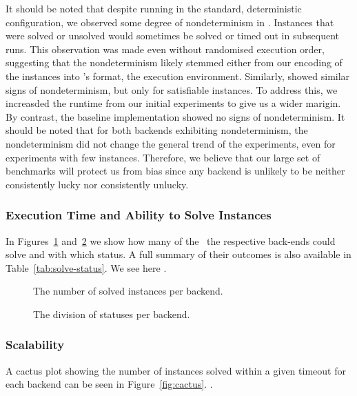 \documentclass[acmsmall,review,anonymous]{acmart}\settopmatter{printfolios=true,printccs=false,printacmref=true}
\theoremstyle{definition}
\begin{document}
It should be noted that despite running in the standard, deterministic configuration, we observed some degree of nondeterminism in \Nuxmv{}. Instances that were solved or unsolved would sometimes be solved or timed out in subsequent runs. This observation was made even without randomised execution order, suggesting that the nondeterminism likely stemmed either from our encoding of the instances into \Nuxmv{}'s format, the execution environment. Similarly, \Calculus{} showed similar signs of nondeterminism, but only for satisfiable instances. To address this, we increasded the runtime from our initial experiments to give us a wider marigin. By contrast, the baseline implementation showed no signs of nondeterminism. It should be noted that for both backends exhibiting nondeterminism, the nondeterminism did not change the general trend of the experiments, even for experiments with few instances. Therefore, we believe that our large set of benchmarks will protect us from bias since any backend is unlikely to be neither consistently lucky nor consistently unlucky.

\subsubsection{Execution Time and Ability to Solve Instances}\label{sec:runtime}

In Figures~\ref{fig:solve-nr} and~\ref{fig:solve-division} we show how many of the~\NrBenchmarks{} the respective back-ends could solve and with which status. A full summary of their outcomes is also available in Table~\ref{tab:solve-status}. We see here .

\begin{figure}
  \caption{The number of solved instances per backend.}
  \label{fig:solve-nr}
\end{figure}

\begin{figure}
  \caption{The division of statuses per backend.}
  \label{fig:solve-division}
\end{figure}

\subsubsection{Scalability}\label{sec:scaling}

A cactus plot showing the number of instances solved within a given timeout for each backend can be seen in Figure~\ref{fig:cactus}. .
\end{document}

